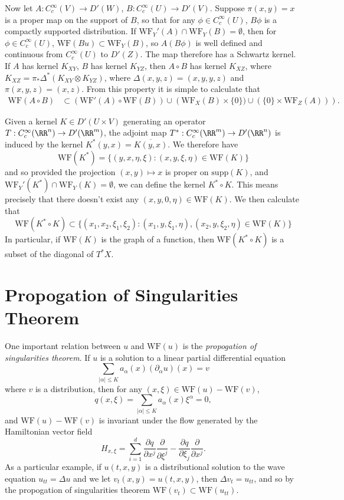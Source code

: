 Now let $A: C_c^\infty(V) \to D'(W)$, $B: C_c^\infty(U) \to D'(V)$. Suppose $\pi(x,y) = x$ is a proper map on the support of $B$, so that for any $\phi \in C_c^\infty(U)$, $B\phi$ is a compactly supported distribution. If $\text{WF}_Y'(A) \cap \text{WF}_Y(B) = \emptyset$, then for $\phi \in C_c^\infty(U)$, $\text{WF}(Bu) \subset \text{WF}_Y(B)$, so $A(B\phi)$ is well defined and continuous from $C_c^\infty(U)$ to $D'(Z)$. The map therefore has a Schwartz kernel. If $A$ has kernel $K_{XY}$, $B$ has kernel $K_{YZ}$, then $A \circ B$ has kernel $K_{XZ}$, where $K_{XZ} = \pi_* \Delta^*(K_{XY} \otimes K_{YZ})$, where $\Delta(x,y,z) = (x,y,y,z)$ and $\pi(x,y,z) = (x,z)$. From this property it is simple to calculate that
%
\begin{align*}
    \text{WF}(A \circ B) &\subset \left( \text{WF}'(A) \circ \text{WF}(B) \right) \cup \left( \text{WF}_X(B) \times \{ 0 \}) \cup (\{ 0 \} \times \text{WF}_Z(A)) \right).
\end{align*}

\begin{example}
    Given a kernel $K \in D'(U \times V)$ generating an operator $T: C_c^\infty(\RR^n) \to D'(\RR^m)$, the adjoint map $T^*: C_c^\infty(\RR^m) \to D'(\RR^n)$ is induced by the kernel $K^*(y,x) = \overline{K(y,x)}$. We therefore have
    \[ \text{WF}(K^*) = \{ (y,x,\eta,\xi) : (x,y,\xi,\eta) \in \text{WF}(K) \} \]
    and so provided the projection $(x,y) \mapsto x$ is proper on $\text{supp}(K)$, and $\text{WF}_Y'(K^*) \cap \text{WF}_Y(K) = \emptyset$, we can define the kernel $K^* \circ K$. This means precisely that there doesn't exist any $(x,y,0,\eta) \in \text{WF}(K)$. We then calculate that
    \[ \text{WF}(K^* \circ K) \subset \{ (x_1,x_2,\xi_1,\xi_2) : (x_1,y,\xi_1,\eta), (x_2,y,\xi_2,\eta) \in \text{WF}(K) \} \]
    In particular, if $\text{WF}(K)$ is the graph of a function, then $\text{WF}(K^* \circ K)$ is a subset of the diagonal of $T^* X$.
\end{example}



\section{Propogation of Singularities Theorem}

One important relation between $u$ and $\text{WF}(u)$ is the \emph{propogation of singularities theorem}. If $u$ is a solution to a linear partial differential equation
%
\[ \sum_{|\alpha| \leq K} a_\alpha(x) (\partial_\alpha u)(x) = v \]
%
where $v$ is a distribution, then for any $(x,\xi) \in \text{WF}(u) - \text{WF}(v)$,
%
\[ q(x,\xi) = \sum_{|\alpha| \leq K} a_\alpha(x) \xi^\alpha = 0, \]
%
and $\text{WF}(u) - \text{WF}(v)$ is invariant under the flow generated by the Hamiltonian vector field
%
\[ H_{x,\xi} = \sum_{i = 1}^d \frac{\partial q}{\partial x^j} \frac{\partial}{\partial \xi^j} - \frac{\partial q}{\partial \xi_j} \frac{\partial}{\partial x^j}. \]
%
As a particular example, if $u(t,x,y)$ is a distributional solution to the wave equation $u_{tt} = \Delta u$ and we let $v_t(x,y) = u(t,x,y)$, then $\Delta v_t = u_{tt}$, and so by the propogation of singularities theorem $\text{WF}(v_t) \subset \text{WF}(u_{tt})$.

